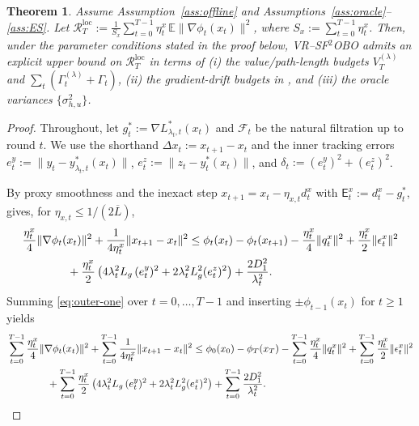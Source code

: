 \documentclass{uai2026} %
\newtheorem{theorem}{Theorem}[section]
\newcommand{\EE}{\mathbb{E}}
\newcommand{\F}{\mathcal{F}}
\begin{document}
\iffalse
\begin{theorem}\label{thm:vr-sf2obo-tv-O1}
Assume Assumption~\ref{ass:offline} and Assumptions~\ref{ass:oracle}--\ref{ass:ES}.
Let $\mathcal{R}^{\mathrm{loc}}_T:=\frac{1}{S_x}\sum_{t=0}^{T-1}\eta_t^x\,\EE\|\nabla\phi_t(x_t)\|^2$, where $S_x:=\sum_{t=0}^{T-1}\eta_t^x$.
Then, under the parameter conditions stated in the proof below, VR--SF$^2$OBO admits an explicit upper bound on $\mathcal{R}^{\mathrm{loc}}_T$
in terms of (i) the value/path-length budgets $V_T^{(\lambda)}$ and $\sum_t(\Gamma_t^{(\lambda)}+\Gamma_t)$, (ii) the gradient-drift budgets in
, and (iii) the oracle variances $\{\sigma_{h,u}^2\}$.
\end{theorem}



\begin{proof}
Throughout, let $g_t^{*}:=\nabla L^{*}_{\lambda_t,t}(x_t)$ and $\F_t$ be the natural filtration up to round $t$.
We use the shorthand $\Delta x_t:=x_{t+1}-x_t$ and the inner tracking errors
$e_t^y:=\|y_t-y^{*}_{\lambda_t,t}(x_t)\|$, $e_t^z:=\|z_t-y_t^{*}(x_t)\|$, and $\delta_t:=(e_t^y)^2+(e_t^z)^2$.

By proxy smoothness and the inexact step $x_{t+1}=x_t-\eta_{x,t}d_t^x$ with
$\mathsf{E}_{t}^{x}:=d_t^x-g_t^{*}$,  gives, for $\eta_{x,t}\le 1/(2\overline L)$,
\begin{align}\label{eq:outer-one}
\MoveEqLeft[4]\frac{\eta_{t}^{x}}{4}\|\nabla \phi_{t}(x_{t})\|^{2}+\frac{1}{4\eta_{t}^{x}}\|x_{t+1}-x_{t}\|^{2}\le \phi_{t}(x_{t})-\phi_{t}(x_{t+1})-\frac{\eta_{t}^{x}}{4}\|q_{t}^{x}\|^{2}+\frac{\eta_{t}^{x}}{2}\|\epsilon_{t}^{x}\|^{2}\nonumber\\
        &+\frac{\eta_{t}^{x}}{2}\left(4\lambda_{t}^{2} L_g\,(e_t^y)^{2}+2\lambda_{t}^{2} L_g^{2}(e_t^z)^{2}\right)+\frac{2D_{1}^{2}}{\lambda_{t}^{2}}.
\end{align}
Summing \eqref{eq:outer-one} over $t=0,\dots,T-1$ and inserting $\pm \phi_{t-1}(x_t)$ for $t\ge1$ yields
\begin{align}
\MoveEqLeft[4]\sum_{t=0}^{T-1}\frac{\eta_{t}^{x}}{4}\|\nabla \phi_{t}(x_{t})\|^{2}+\sum_{t=0}^{T-1}\frac{1}{4\eta_{t}^{x}}\|x_{t+1}-x_{t}\|^{2}\le \phi_{0}(x_{0})-\phi_{T}(x_{T})-\sum_{t=0}^{T-1}\frac{\eta_{t}^{x}}{4}\|q_{t}^{x}\|^{2}+\sum_{t=0}^{T-1}\frac{\eta_{t}^{x}}{2}\|\epsilon_{t}^{x}\|^{2}\nonumber\\
        &+\sum_{t=0}^{T-1}\frac{\eta_{t}^{x}}{2}\left(4\lambda_{t}^{2} L_g\,(e_t^y)^{2}+2\lambda_{t}^{2} L_g^{2}(e_t^z)^{2}\right)+\sum_{t=0}^{T-1}\frac{2D_{1}^{2}}{\lambda_{t}^{2}}.\label{eq:outer-master}
\end{align}



\end{proof}
\end{document}
